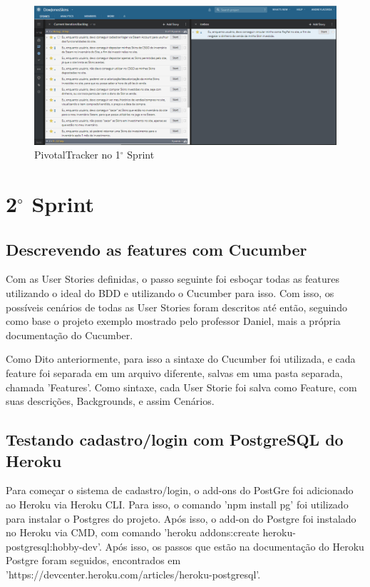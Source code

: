 \begin{figure}[!htb]
	\centering
	\includegraphics[scale=0.4]{Imagens/Pivotal1.png}
	\caption{PivotalTracker no 1$^{\circ}$ Sprint}
\end{figure}

\section{2$^{\circ}$ Sprint}
\subsection{Descrevendo as features com Cucumber}
Com as User Stories definidas, o passo seguinte foi esboçar todas as features utilizando o ideal do BDD 
e utilizando o Cucumber para isso. Com isso, os possíveis cenários de todas as User Stories foram descritos até então, seguindo como base o projeto exemplo mostrado pelo professor Daniel, 
mais a própria documentação do Cucumber.

Como Dito anteriormente, para isso a sintaxe do Cucumber foi utilizada, e cada feature foi separada em um arquivo diferente, 
salvas em uma pasta separada, chamada 'Features'. 
Como sintaxe, cada User Storie foi salva como Feature, com suas descrições, Backgrounds, e assim Cenários.

\subsection{Testando cadastro/login com PostgreSQL do Heroku}
Para começar o sistema de cadastro/login, o add-ons do PostGre foi adicionado ao Heroku via Heroku CLI. Para isso, 
o comando 'npm install pg' foi utilizado para instalar o Postgres do projeto. Após isso, o add-on do Postgre foi instalado no
Heroku via CMD, com comando 'heroku addons:create heroku-postgresql:hobby-dev'. Após isso, os passos 
que estão na documentação do Heroku Postgre foram seguidos, encontrados em 'https://devcenter.heroku.com/articles/heroku-postgresql'.

